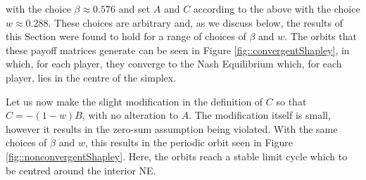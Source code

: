 \documentclass{article}
\theoremstyle{definition}
\begin{document}
  with the choice $\beta \approx 0.576$ and set $A$ and $C$ according to the above with the choice $w \approx 0.288$. These choices are arbitrary and, as we discuss below, the results of this Section were found to hold for a range of choices of $\beta$ and $w$. The orbits that these payoff matrices generate can be seen in Figure \ref{fig::convergentShapley}, in which, for each player, they converge to the Nash Equilibrium which, for each player, lies in the centre of the simplex.

  Let us now make the slight modification in the definition of $C$ so that
    $C  = - (1 - w) B$, 
  with no alteration to $A$. The modification itself is small, however it results in the zero-sum
  assumption being violated. With the same choices of $\beta$ and $w$, this results in the periodic
  orbit seen in Figure \ref{fig::nonconvergentShapley}. Here,
  the orbits reach a stable limit cycle which to be centred around the interior NE.
\end{document}
